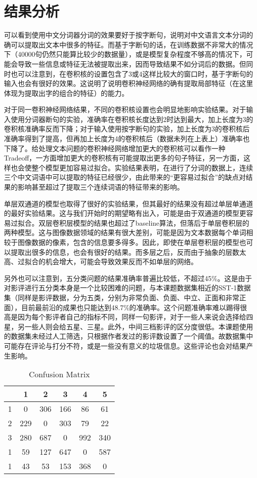 \section{结果分析}
可以看到使用中文分词器分词的效果要好于按字断句，说明对中文语言文本分词的确可以提取出文本中很多的特征。而基于字断句的话，在训练数据不非常大的情况下（40000句仍然只能算比较少的数据量），或是模型复杂程度不够高的情况下，可能会导致一些信息或特征无法被提取出来，因而导致结果不如分词后的数据。但同时也可以注意到，在卷积核的设置包含了3或4这样比较大的窗口时，基于字断句的输入也会有很好的效果。这说明了说明卷积神经网络的确有提取局部特征（在这里体现为提取出字的组合的特征）的能力。

对于同一卷积神经网络结果，不同的卷积核设置也会明显地影响实验结果。对于输入使用分词器断句的实验，准确率在卷积核长度达到2时达到最大，加上长度为3的卷积核准确率反而下降；对于输入使用按字断句的实验，加上长度为3的卷积核后准确率得到了提高，但再加上长度为4的卷积核后（数据未列在上表上）准确率也下降了。给处理文本问题的卷积神经网络增加更大的卷积核可以看作一种Tradeoff，一方面增加更大的卷积核有可能提取出更多的句子特征，另一方面，这样也会使整个模型更加容易过拟合。实验结果表明，在进行了分词的数据上，连续三个中文词语中可以提取的特征已经很少，由此带来的“更容易过拟合”的缺点对结果的影响甚至超过了提取三个连续词语的特征带来的影响。

单层双通道的模型也取得了很好的实验结果，但其最好的结果没有超过单层单通道的最好实验结果。这与我们开始时的期望略有出入，可能是由于双通道的模型更容易过拟合。双层卷积层模型的结果也超过了baseline算法，但落后于单层卷积层的两种模型。这与图像数据领域的结果有很大差别，可能是因为文本数据每个单词相较于图像数据的像素，包含的信息要多得多。因此，即使在单层卷积层的模型也可以提取出很多的信息，也会有很好的结果。而多层之后，反而由于抽象的层数太高、过拟合的机会增大，可能会导致效果反而不如单层的网络。

另外也可以注意到，五分类问题的结果准确率普遍比较低，不超过45\%。这是由于对影评进行五分类本身是一个比较困难的问题，与本课题数据集相近的SST-1数据集（同样是影评数据，分为五类，分别为非常负面、负面、中立、正面和非常正面），目前最前沿的成果也只能达到48.7\%的准确率。这个问题准确率难以踢得很高是因为每个影评者自己的指标不同，同样一句影评，对于一些人来说会选择给四星，另一些人则会给五星、三星。此外，中间三档影评的区分度很低。本课题使用的数据集未经过人工筛选，只根据作者发过的影评数设置了一个阈值。故数据集中可能存在评论与打分不符，或是一些没有意义的垃圾信息。这些评论也会对结果产生影响。

\begin{table}
\centering
\caption{Confusion Matrix} \label{tab:confusion}
\begin{tabular}{c|c|c|c|c|c}
    \hline
     & 1 & 2 & 3 & 4 & 5\\
    \hline
    1 & 0 & 306 & 166 & 86 & 61\\
    \hline
    2 & 229 & 0 & 303 & 79 & 22 \\
    \hline
    3 & 280 & 687 & 0 & 992 & 340 \\
    \hline
    1 & 59 & 127 & 647 & 0 & 587\\
    \hline
    1 & 43 & 53 & 153 & 368 & 0\\
    \hline
\end{tabular}
\end{table}

